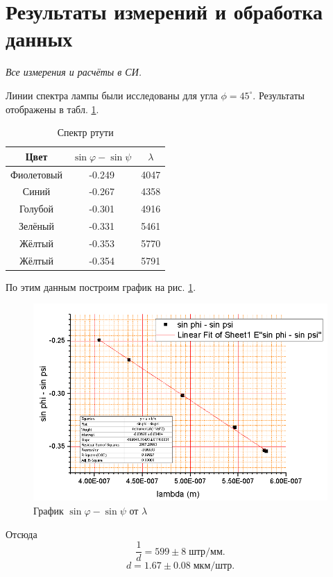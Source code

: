 \documentclass[a4paper]{article}
\begin{document}
\section{Результаты измерений и обработка данных}
\emph{Все измерения и расчёты в СИ.}

Линии спектра лампы были исследованы для угла $ \phi = 45^\circ $. Результаты отображены в табл. \ref{tab:allspectre}.
\begin{table}[htb]
	\centering
\begin{tabular}{|c|c|c|}
	\hline
	Цвет       & $ \sin\varphi -\sin\psi $ & $ \lambda$ \\ \hline
	Фиолетовый & -0.249                  & 4047       \\ \hline
	Синий      & -0.267                   & 4358       \\ \hline
	Голубой    & -0.301                  & 4916       \\ \hline
	Зелёный    & -0.331                  & 5461       \\ \hline
	Жёлтый     & -0.353                  & 5770       \\ \hline
	Жёлтый     & -0.354                  & 5791       \\ \hline
\end{tabular}
\caption{Спектр ртути}
\label{tab:allspectre}
\end{table}

По этим данным построим график на рис. \ref{fig:screenshot1}.
\begin{figure}[tbp]
	\centering
	\includegraphics[width=0.8\linewidth]{Screenshot_1}
	\caption{График $\sin \varphi - \sin \psi$ от $\lambda$}
	\label{fig:screenshot1}
\end{figure}
Отсюда
\begin{equation*}\label{key}
	\frac{1}{d} = 599 \pm 8\; штр/мм.
\end{equation*}
\begin{equation*}\label{key}
	d = 1.67 \pm 0.08 \; мкм/штр.
\end{equation*}
\end{document}
